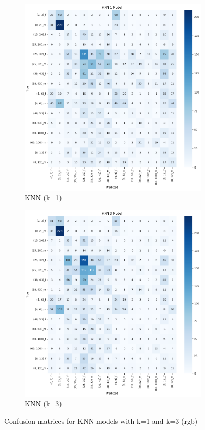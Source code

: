 \documentclass{article}
\begin{document}
\begin{figure}[H]
    \centering
    \begin{subfigure}[b]{0.48\textwidth}
        \includegraphics[width=\textwidth]{assets/confusion_matrix/rgb/KNN1.png}
        \caption{KNN (k=1)}
    \end{subfigure}
    \hfill
    \begin{subfigure}[b]{0.48\textwidth}
        \includegraphics[width=\textwidth]{assets/confusion_matrix/rgb/KNN3.png}
        \caption{KNN (k=3)}
    \end{subfigure}
    \caption{Confusion matrices for KNN models with k=1 and k=3 (rgb)}
    \label{fig:rgb_confusion_matrices_3}
\end{figure}
\end{document}
